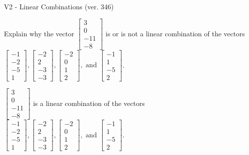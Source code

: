 \begin{exercise}
  \begin{exerciseTitle}V2 - Linear Combinations (ver. 346)\end{exerciseTitle}
  \begin{exerciseStatement}
    Explain why the vector \(\left[\begin{array}{c}
3 \\
0 \\
-11 \\
-8
\end{array}\right]\)  is or is not a linear 
	combination of the vectors \(\left[\begin{array}{c}
-1 \\
-2 \\
-5 \\
1
\end{array}\right] , \left[\begin{array}{c}
-2 \\
2 \\
-3 \\
-3
\end{array}\right] , \left[\begin{array}{c}
-2 \\
0 \\
1 \\
2
\end{array}\right] , \text{ and } \left[\begin{array}{c}
-1 \\
1 \\
-5 \\
2
\end{array}\right]\).
	


  \end{exerciseStatement}
  \begin{exerciseAnswer}
   \(\left[\begin{array}{c}
3 \\
0 \\
-11 \\
-8
\end{array}\right]\) 
  	 is  
	a linear combination of the vectors \(\left[\begin{array}{c}
-1 \\
-2 \\
-5 \\
1
\end{array}\right] , \left[\begin{array}{c}
-2 \\
2 \\
-3 \\
-3
\end{array}\right] , \left[\begin{array}{c}
-2 \\
0 \\
1 \\
2
\end{array}\right] , \text{ and } \left[\begin{array}{c}
-1 \\
1 \\
-5 \\
2
\end{array}\right]\).


\end{exerciseAnswer}
\end{exercise}
